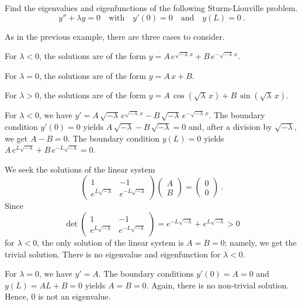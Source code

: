 \begin{egg}
Find the eigenvalues and eigenfunctions of the following
Sturm-Liouville problem.
\[
y''+ \lambda y = 0 \quad \text{with} \quad y'(0)=0 \quad \text{and}
\quad y(L) = 0 \ .
\]

As in the previous example, there are three cases to consider.

 For $\lambda < 0$, the solutions are of the form
$\displaystyle y = A\, e^{\sqrt{-\lambda}\,x}+
B\, e^{-\sqrt{-\lambda}\,x}$.

 For $\lambda = 0$, the solutions are of the form
$\displaystyle y = A\,x + B$.

 For $\lambda > 0$, the solutions are of the form
$\displaystyle y = A\, \cos\left(\sqrt{\lambda}\,x\right)+
B\, \sin\left(\sqrt{\lambda}\,x\right)$.

 For $\lambda < 0$, we have
$\displaystyle y' = A\,\sqrt{-\lambda}\, e^{\sqrt{-\lambda}\,x} -
B\, \sqrt{-\lambda}\, e^{-\sqrt{-\lambda}\,x}$.
The boundary condition $y'(0)=0$ yields
$A\,\sqrt{-\lambda} - B\, \sqrt{-\lambda} = 0$ and, after a division
by $\sqrt{-\lambda}$, we get $A-B=0$.  The boundary condition
$y(L) = 0$ yields
$\displaystyle A\, e^{L\sqrt{-\lambda}} + B\, e^{-L\sqrt{-\lambda}} =0$.

We seek the solutions of the linear system
\[
\begin{pmatrix}
1 & -1 \\
e^{L\sqrt{-\lambda}} & e^{-L\sqrt{-\lambda}}
\end{pmatrix}
\begin{pmatrix} A\\ B \end{pmatrix}
= \begin{pmatrix} 0 \\ 0 \end{pmatrix} \  .
\]
Since
\[
\det 
\begin{pmatrix}
1 & -1 \\
e^{L\sqrt{-\lambda}} & e^{-L\sqrt{-\lambda}}
\end{pmatrix}
= e^{-L\sqrt{-\lambda}} + e^{L\sqrt{-\lambda}} 
> 0
\]
for $\lambda < 0$, the only solution of the linear system is $A=B=0$;
namely, we get the trivial solution.  There is no eigenvalue and
eigenfunction for $\lambda <0$.

 For $\lambda = 0$, we have $\displaystyle y' = A$.
The boundary conditions $y'(0)= A= 0$ and $y(L) = AL +B = 0$ yields
$A=B=0$.  Again, there is no non-trivial solution.  Hence, $0$ is
not an eigenvalue.


\end{egg}
